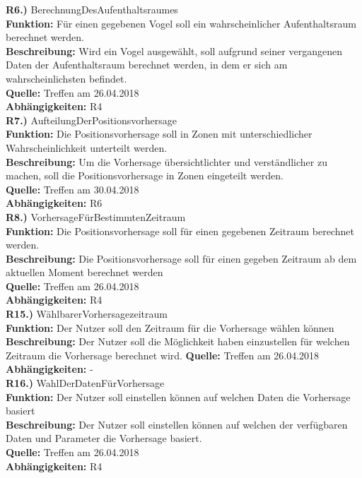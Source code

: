 \documentclass[12pt]{article} %
\begin{document}
\textbf{R6.)} BerechnungDesAufenthaltsraumes \\
\textbf{Funktion:} Für einen gegebenen Vogel soll ein wahrscheinlicher Aufenthaltsraum berechnet werden. \\
\textbf{Beschreibung:} Wird ein Vogel ausgewählt, soll aufgrund seiner vergangenen Daten der Aufenthaltsraum berechnet werden, in dem er sich am wahrscheinlichsten befindet. \\
\textbf{Quelle:} Treffen am 26.04.2018 \\
\textbf{Abhängigkeiten:} R4 \\

\textbf{R7.)} AufteilungDerPositionsvorhersage \\
\textbf{Funktion:} Die Positionsvorhersage soll in Zonen mit unterschiedlicher Wahrscheinlichkeit unterteilt werden. \\
\textbf{Beschreibung:} Um die Vorhersage übersichtlichter und verständlicher zu machen, soll die Positionsvorhersage in Zonen eingeteilt werden.  \\
\textbf{Quelle:} Treffen am 30.04.2018 \\
\textbf{Abhängigkeiten:} R6 \\

\textbf{R8.)} VorhersageFürBestimmtenZeitraum \\
\textbf{Funktion:} Die Positionsvorhersage soll für einen gegebenen Zeitraum berechnet werden. \\
\textbf{Beschreibung:} Die Positionsvorhersage soll für einen gegeben Zeitraum ab dem aktuellen Moment berechnet werden \\
\textbf{Quelle:} Treffen am 26.04.2018 \\
\textbf{Abhängigkeiten:} R4 \\

\textbf{R15.)} WählbarerVorhersagezeitraum\\
\textbf{Funktion:} Der Nutzer soll den Zeitraum für die Vorhersage wählen können\\
\textbf{Beschreibung:} Der Nutzer soll die Möglichkeit haben einzustellen für welchen Zeitraum die Vorhersage berechnet wird.
\textbf{Quelle:} Treffen am 26.04.2018\\
\textbf{Abhängigkeiten:} - \\

\textbf{R16.)} WahlDerDatenFürVorhersage\\
\textbf{Funktion:} Der Nutzer soll einstellen können auf welchen Daten die Vorhersage basiert\\
\textbf{Beschreibung:} Der Nutzer soll einstellen können auf welchen der verfügbaren Daten und Parameter die Vorhersage basiert.\\
\textbf{Quelle:} Treffen am 26.04.2018\\
\textbf{Abhängigkeiten:} R4 \\
\\
\end{document}
